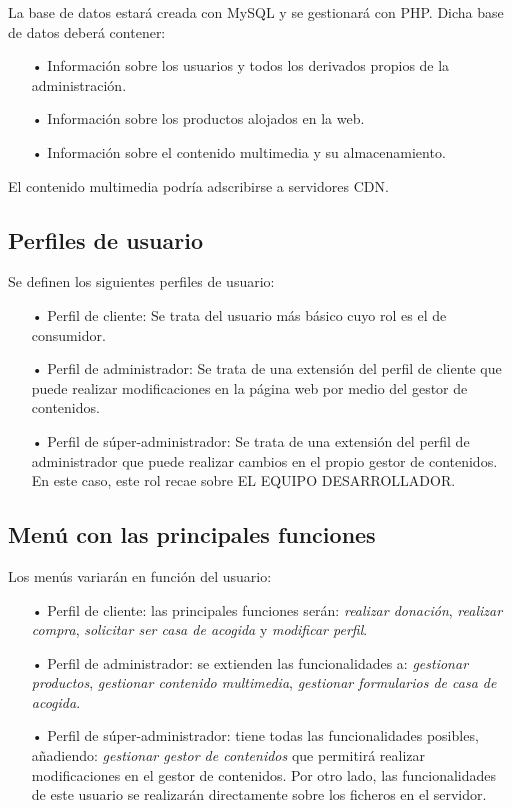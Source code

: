 \documentclass[12pt]{article}
\theoremstyle{definition}
\begin{document}
La base de datos estará creada con MySQL y se gestionará con PHP. Dicha base de datos deberá contener:

\begin{itemize}
\item[•] Información sobre los usuarios y todos los derivados propios de la administración.
\item[•] Información sobre los productos alojados en la web.
\item[•] Información sobre el contenido multimedia y su almacenamiento.
\end{itemize}

El contenido multimedia podría adscribirse a servidores CDN.


\subsection*{Perfiles de usuario}

Se definen los siguientes perfiles de usuario:

\begin{itemize}
\item[•] Perfil de cliente: Se trata del usuario más básico cuyo rol es el de consumidor.
\item[•] Perfil de administrador: Se trata de una extensión del perfil de cliente que puede realizar modificaciones en la página web por medio del gestor de contenidos.
\item[•] Perfil de súper-administrador: Se trata de una extensión del perfil de administrador que puede realizar cambios en el propio gestor de contenidos. En este caso, este rol recae sobre EL EQUIPO DESARROLLADOR.
\end{itemize}

\subsection*{Menú con las principales funciones}

Los menús variarán en función del usuario:

\begin{itemize}

\item[•] Perfil de cliente: las principales funciones serán: \textit{realizar donación}, \textit{realizar compra}, \textit{solicitar ser casa de acogida } y \textit{modificar perfil}.

\item[•] Perfil de administrador: se extienden las funcionalidades a: \textit{gestionar productos}, \textit{gestionar contenido multimedia}, \textit{gestionar formularios de casa de acogida}.

\item[•] Perfil de súper-administrador: tiene todas las funcionalidades posibles, añadiendo: \textit{gestionar gestor de contenidos} que permitirá realizar modificaciones en el gestor de contenidos. Por otro lado, las funcionalidades de este usuario se realizarán directamente sobre los ficheros en el servidor.

\end{itemize}
\end{document}
